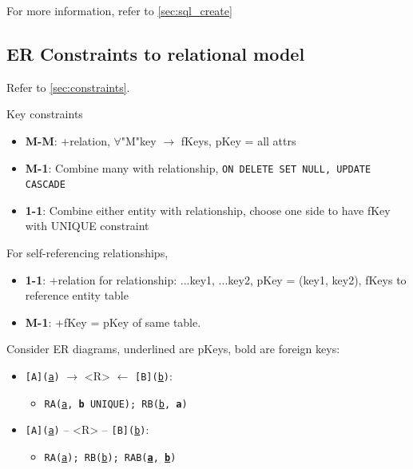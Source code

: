 For more information, refer to \ref{sec:sql_create}

\subsection{ER Constraints to relational model}

Refer to \ref{sec:constraints}.

\begin{theorem}
    {Key constraints}
    \begin{itemize}
        \item \textbf{M-M}: +relation, $\forall$"M"key $\to$ fKeys, pKey = all attrs
        \item \textbf{M-1}: Combine many with relationship, \texttt{ON DELETE SET NULL, UPDATE CASCADE}
        \item \textbf{1-1}:  Combine either entity with relationship, choose one side to have fKey with UNIQUE constraint
    \end{itemize}

    For self-referencing relationships,
    \begin{itemize}
        \item \textbf{1-1}: +relation for relationship: ...{key1}, ...{key2}, pKey = (key1, key2), fKeys to reference entity table
        \item \textbf{M-1}: +fKey = pKey of same table.
    \end{itemize}

    \tcblower

    Consider ER diagrams, underlined are pKeys, bold are foreign keys:
    \begin{itemize}
        \item \texttt{[A](\underline{a})} $\rightarrow$ <R> $\leftarrow$ \texttt{[B](\underline{b})}:
              \begin{itemize}
                  \item \texttt{RA(\underline{a}, \textbf{b} UNIQUE); RB(\underline{b}, \textbf{a})}
              \end{itemize}
        \item \texttt{[A](\underline{a})} -- <R> -- \texttt{[B](\underline{b})}:
              \begin{itemize}
                  \item \texttt{RA(\underline{a}); RB(\underline{b}); RAB(\textbf{\underline{a}}, \textbf{\underline{b}})}
              \end{itemize}
    \end{itemize}
\end{theorem}


